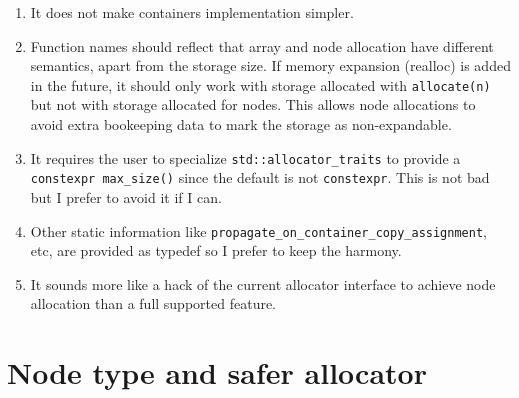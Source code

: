 \documentclass[11pt]{article}
\begin{document}
\begin{enumerate}
\item It does not make containers implementation simpler.

\item Function names should reflect that array and node allocation have
different semantics, apart from the storage size. If memory expansion (realloc)
is added in the future, it should only work with storage allocated with
\texttt{allocate(n)} but not with storage allocated for nodes. This allows node
allocations to avoid extra bookeeping data to mark the storage as
non-expandable.

\item It requires the user to specialize \texttt{std::allocator\_traits} to
provide a \texttt{constexpr max\_size()} since the default is not
\texttt{constexpr}. This is not bad but I prefer to avoid it if I can.

\item Other static information like \texttt{propagate\_on\_container\_copy\_assignment}, etc,
are provided as typedef so I prefer to keep the harmony.

\item It sounds more like a hack of the current allocator interface to achieve
node allocation than a full supported feature.

\end{enumerate}

\newpage

\section{Node type and safer allocator} \label{alternative}
\end{document}
